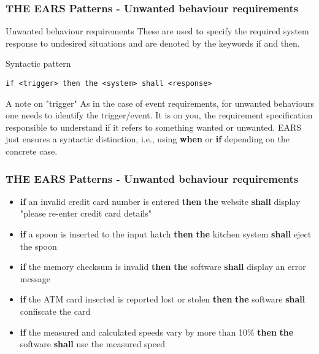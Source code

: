 \documentclass[aspectratio=169]{beamer}
\newcommand{\earsw}[3]{{\bf \color{mygreen}if} {#1} {\bf \color{mygreen}then} {\bf \color{mypurple}the} {#2} {\bf \color{mypurple}shall} {#3}}
\begin{document}
%
\begin{frame}[fragile]
 \frametitle{THE EARS Patterns - Unwanted behaviour requirements}
  \begin{block}{Unwanted behaviour requirements}
  These are used to specify the required system response to undesired situations and are denoted by the keywords if and then.
  \end{block}
  \begin{block}{Syntactic pattern}
   \begin{lstlisting}[language=EARS]
        if <trigger> then the <system> shall <response> 
   \end{lstlisting}
  \end{block}
  \begin{block}{A note on "trigger"}
    As in the case of event requirements, for unwanted behaviours one needs to identify the trigger/event. It is on you, the requirement specification responsible to understand if it refers to something wanted or unwanted. EARS just ensures a syntactic distinction, i.e., using {{\bf \color{mypurple} when}} or {{\bf \color{mygreen} if}} depending on the concrete case.
  \end{block}
\end{frame}  
%
\begin{frame}
  \frametitle{THE EARS Patterns - Unwanted behaviour requirements}
  \begin{example}
   \begin{itemize}
    \item \earsw{an invalid credit card number is entered}{website}{display "please re-enter credit card details"}
    \item \earsw{a spoon is inserted to the input hatch}{kitchen system}{eject the spoon}
    \item \earsw{the memory checksum is invalid}{software}{display an error message}
    \item \earsw{the ATM card inserted is reported lost or stolen}{software}{confiscate the card}
    \item \earsw{the measured and calculated speeds vary by more than
10\%}{software}{use the measured speed}
   \end{itemize}
  \end{example}
\end{frame}



%
%
\end{document}
